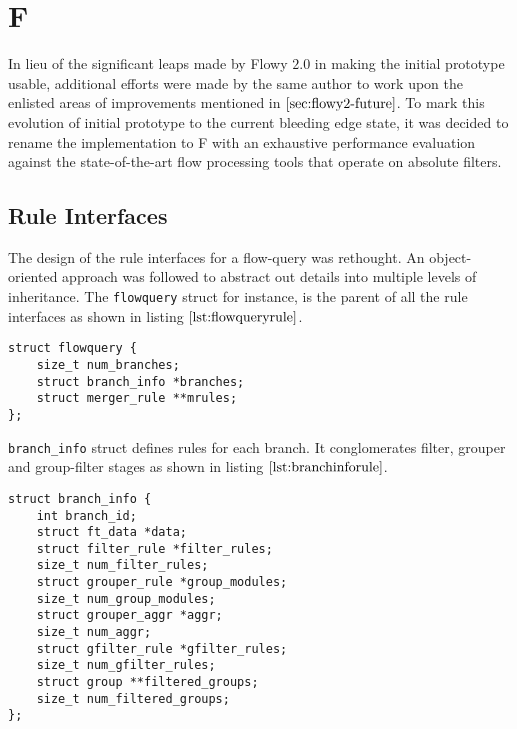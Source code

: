 \chapter{F}\label{ch:f}

In lieu of the significant leaps made by Flowy $2.0$ in making the initial prototype usable, additional efforts were made by the same author to work upon the enlisted areas of improvements mentioned in $\ref{sec:flowy2-future}$. To mark this evolution of initial prototype to the current bleeding edge state, it was decided to rename the implementation to F \cite{jschauer:2012} with an exhaustive performance evaluation against the state-of-the-art flow processing tools \cite{sromig:2000, phaag:2006} that operate on absolute filters.

\section{Rule Interfaces}\label{sec:rule-interfaces}
The design of the rule interfaces for a flow-query was rethought. An object-oriented approach was followed to abstract out details into multiple levels of inheritance. The \texttt{flowquery} struct for instance, is the parent of all the rule interfaces as shown in listing $\ref{lst:flowqueryrule}$.
\begin{lstlisting}
struct flowquery {
	size_t num_branches;
	struct branch_info *branches;
	struct merger_rule **mrules;
};
\end{lstlisting}

\texttt{branch\_info} struct defines rules for each branch. It conglomerates filter, grouper and group-filter stages as shown in listing $\ref{lst:branchinforule}$. 
\begin{lstlisting}
struct branch_info {
	int branch_id;
	struct ft_data *data;
	struct filter_rule *filter_rules;
	size_t num_filter_rules;
	struct grouper_rule *group_modules;
	size_t num_group_modules;
	struct grouper_aggr *aggr;
	size_t num_aggr;
	struct gfilter_rule *gfilter_rules;
	size_t num_gfilter_rules;
	struct group **filtered_groups;
	size_t num_filtered_groups;
};
\end{lstlisting}

